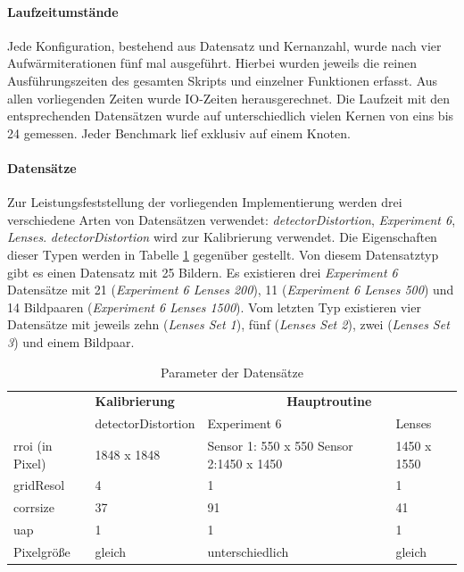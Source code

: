 \paragraph{Laufzeitumstände}

Jede Konfiguration, bestehend aus Datensatz und Kernanzahl, wurde nach vier Aufwärmiterationen fünf mal ausgeführt. Hierbei wurden jeweils die reinen Ausführungszeiten des gesamten Skripts und einzelner Funktionen erfasst. Aus allen vorliegenden Zeiten wurde \gls{IO}-Zeiten herausgerechnet. Die Laufzeit mit den entsprechenden Datensätzen wurde auf unterschiedlich vielen Kernen von eins bis 24 gemessen. Jeder Benchmark lief exklusiv auf einem Knoten. 

\paragraph{Datensätze}

Zur Leistungsfeststellung der vorliegenden Implementierung werden drei verschiedene Arten von Datensätzen verwendet: \textit{detectorDistortion}, \textit{Experiment 6}, \textit{Lenses}. \textit{detectorDistortion} wird zur Kalibrierung verwendet. Die Eigenschaften dieser Typen werden in Tabelle \ref{tab:datasets} gegenüber gestellt.  Von diesem Datensatztyp gibt es einen Datensatz mit 25 Bildern. Es existieren drei \textit{Experiment 6} Datensätze mit 21 (\textit{Experiment 6 Lenses 200}), 11 (\textit{Experiment 6 Lenses 500}) und 14 Bildpaaren (\textit{Experiment 6 Lenses 1500}). Vom letzten Typ existieren vier Datensätze mit jeweils zehn (\textit{Lenses Set 1}), fünf (\textit{Lenses Set 2}), zwei (\textit{Lenses Set 3}) und einem Bildpaar.

\begin{table}
	\begin{tabularx}{\textwidth}{| X || X || X | X |}
		\hline
		& \textbf{Kalibrierung} & \multicolumn{2}{c|}{\textbf{Hauptroutine}} \\
		\cline{2-4}
		& detectorDistortion & Experiment 6 & Lenses \\
		\hline
		\hline
		\gls{rroi} (in Pixel) & 1848 x 1848 & Sensor 1: 550 x 550 \newline
		Sensor 2:1450 x 1450  & 1450 x 1550 \\
		\hline
		\gls{gridResol} & 4 & 1 & 1 \\
		\hline
		\gls{corrsize} & 37 & 91 & 41 \\
		\hline
		\gls{uap} & 1 & 1 & 1 \\
		\hline
		Pixelgröße & gleich & unterschiedlich & gleich \\
		\hline
	\end{tabularx}
	\caption{Parameter der Datensätze}
	\label{tab:datasets}
\end{table}

